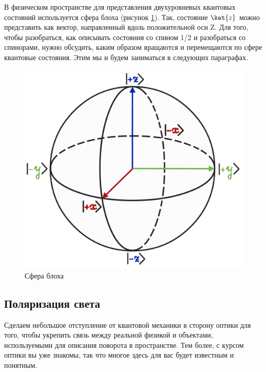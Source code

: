 В физическом пространстве для представления двухуровневых квантовых состояний используется сфера блоха (рисунок \ref{fig B.3}). Так, состояние $\ket{z}$ можно представить как вектор, направленный вдоль положительной оси Z. Для того, чтобы разобраться, как описывать состояния со спином 1/2 и разобраться со спинорами, нужно обсудить, каким образом вращаются и перемещаются по сфере квантовые состояния. Этим мы и будем заниматься в следующих параграфах.
\begin{figure}[h!]
\centering
\includegraphics[scale=0.23]{appendix/images/bloch sphere.png}
\caption{Сфера блоха}
\label{fig B.3}
\end{figure}

\subsection{Поляризация света}
Сделаем небольшое отступление от квантовой механики в сторону оптики для того, чтобы укрепить связь между реальной физикой и объектами, используемыми для описания поворота в пространстве. Тем более, с курсом оптики вы уже знакомы, так что многое здесь для вас будет известным и понятным.
